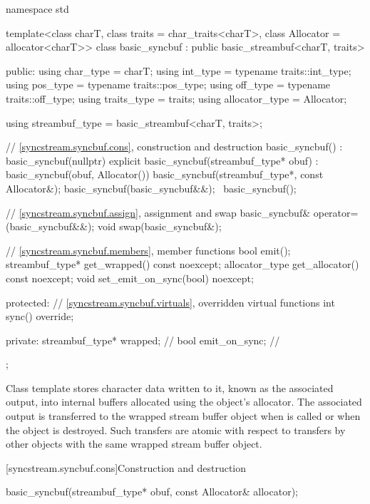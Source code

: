 %
\begin{codeblock}
namespace std {
  template<class charT, class traits = char_traits<charT>, class Allocator = allocator<charT>>
  class basic_syncbuf : public basic_streambuf<charT, traits> {
  public:
    using char_type      = charT;
    using int_type       = typename traits::int_type;
    using pos_type       = typename traits::pos_type;
    using off_type       = typename traits::off_type;
    using traits_type    = traits;
    using allocator_type = Allocator;

    using streambuf_type = basic_streambuf<charT, traits>;

    // \ref{syncstream.syncbuf.cons}, construction and destruction
    basic_syncbuf()
      : basic_syncbuf(nullptr) {}
    explicit basic_syncbuf(streambuf_type* obuf)
      : basic_syncbuf(obuf, Allocator()) {}
    basic_syncbuf(streambuf_type*, const Allocator&);
    basic_syncbuf(basic_syncbuf&&);
    ~basic_syncbuf();

    // \ref{syncstream.syncbuf.assign}, assignment and swap
    basic_syncbuf& operator=(basic_syncbuf&&);
    void swap(basic_syncbuf&);

    // \ref{syncstream.syncbuf.members}, member functions
    bool emit();
    streambuf_type* get_wrapped() const noexcept;
    allocator_type get_allocator() const noexcept;
    void set_emit_on_sync(bool) noexcept;

  protected:
    // \ref{syncstream.syncbuf.virtuals}, overridden virtual functions
    int sync() override;

  private:
    streambuf_type* wrapped;    // \expos
    bool emit_on_sync{};        // \expos
  };
}
\end{codeblock}

\pnum
Class template  stores character data
written to it, known as the associated output, into internal
buffers allocated using the object's allocator.
The associated output is transferred to the
wrapped stream buffer object 
when  is called
or when the  object is destroyed.
Such transfers are atomic with respect to transfers
by other  objects
with the same wrapped stream buffer object.

[syncstream.syncbuf.cons]{Construction and destruction}

%
\begin{itemdecl}
basic_syncbuf(streambuf_type* obuf, const Allocator& allocator);
\end{itemdecl}

